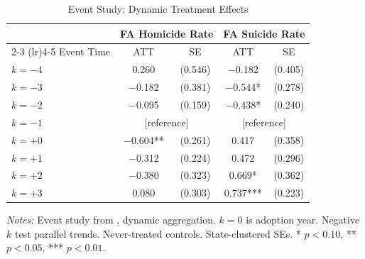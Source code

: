 \begin{table}[H]
\centering
\caption{Event Study: Dynamic Treatment Effects}
\begin{threeparttable}
\begin{tabular}{lcccc}
\toprule
& \multicolumn{2}{c}{FA Homicide Rate} & \multicolumn{2}{c}{FA Suicide Rate} \\
\cmidrule(lr){2-3} \cmidrule(lr){4-5}
Event Time & ATT & SE & ATT & SE \\
\midrule
$k = -4$ & 0.260 & (0.546) & $-$0.182 & (0.405) \\
$k = -3$ & $-$0.182 & (0.381) & $-$0.544* & (0.278) \\
$k = -2$ & $-$0.095 & (0.159) & $-$0.438* & (0.240) \\
$k = -1$ & \multicolumn{2}{c}{[reference]} & \multicolumn{2}{c}{[reference]} \\
$k = +0$ & $-$0.604** & (0.261) & 0.417 & (0.358) \\
$k = +1$ & $-$0.312 & (0.224) & 0.472 & (0.296) \\
$k = +2$ & $-$0.380 & (0.323) & 0.669* & (0.362) \\
$k = +3$ & 0.080 & (0.303) & 0.737*** & (0.223) \\
\bottomrule
\end{tabular}
\begin{tablenotes}[flushleft]
\small
\item \textit{Notes:} Event study from \citet{callaway2021}, dynamic aggregation. $k=0$ is adoption year. Negative $k$ test parallel trends. Never-treated controls. State-clustered SEs. * $p<0.10$, ** $p<0.05$, *** $p<0.01$.
\end{tablenotes}
\end{threeparttable}
\label{tab:eventstudy}
\end{table}
